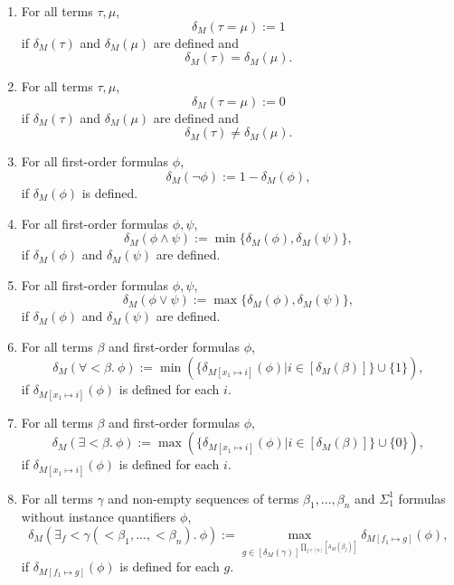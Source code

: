 \documentclass[11pt]{article}
\begin{document}
\begin{enumerate}
	\item For all terms $\tau, \mu$,
		\begin{equation}
			\delta_M(\tau = \mu) := 1
		\end{equation}
		if $\delta_M(\tau)$ and $\delta_M(\mu)$ are defined and
		\begin{equation}
			\delta_M(\tau) = \delta_M(\mu).
		\end{equation}
	\item For all terms $\tau, \mu$,
		\begin{equation}
			\delta_M(\tau = \mu) := 0
		\end{equation}
		if $\delta_M(\tau)$ and $\delta_M(\mu)$ are defined and 
		\begin{equation}
			\delta_M(\tau) \neq \delta_M(\mu).
		\end{equation}
	\item For all first-order formulas $\phi$,
		\begin{equation}
			\delta_M(\neg\phi) := 1 - \delta_M(\phi),
		\end{equation}
		if $\delta_M(\phi)$ is defined.
	\item For all first-order formulas $\phi, \psi$,
		\begin{equation}
			\delta_M(\phi \wedge \psi) := \min\{\delta_M(\phi), \delta_M(\psi)\},
		\end{equation}
		if $\delta_M(\phi)$ and $\delta_M(\psi)$ are defined.
	\item For all first-order formulas $\phi, \psi$,
		\begin{equation}
			\delta_M(\phi \vee \psi) := \max\{\delta_M(\phi), \delta_M(\psi)\},
		\end{equation}
		if $\delta_M(\phi)$ and $\delta_M(\psi)$ are defined.
	\item For all terms $\beta$ and first-order formulas $\phi$,
		\begin{equation}
			\delta_M(\forall < \beta.\ \phi) := \min(\{\delta_{M[x_1 \mapsto i]}(\phi) | i \in [\delta_M(\beta)]\} \cup \{1\}),
		\end{equation}
		if $\delta_{M[x_1 \mapsto i]}(\phi)$ is defined for each $i$.
	\item For all terms $\beta$ and first-order formulas $\phi$,
		\begin{equation}
			\delta_M(\exists < \beta.\ \phi) := \max(\{\delta_{M[x_1 \mapsto i]}(\phi) | i \in [\delta_M(\beta)]\} \cup \{0\}), 
		\end{equation}
		if $\delta_{M[x_1 \mapsto i]}(\phi)$ is defined for each $i$.
	\item For all terms $\gamma$ and non-empty sequences of terms $\beta_1, ..., \beta_n$ and $\Sigma^1_1$ formulas without instance quantifiers $\phi$,
		\begin{equation}
			\delta_M(\exists_f < \gamma(<\beta_1, ..., <\beta_n).\ \phi)
			:= \max_{g \in [\delta_M(\gamma)]^{\prod_{j \in [n]} [\delta_M(\beta_j)]}} \delta_{M[f_1 \mapsto g]}(\phi),
		\end{equation}
		if $\delta_{M[f_1 \mapsto g]}(\phi)$ is defined for each $g$.


\end{enumerate}
\end{document}
